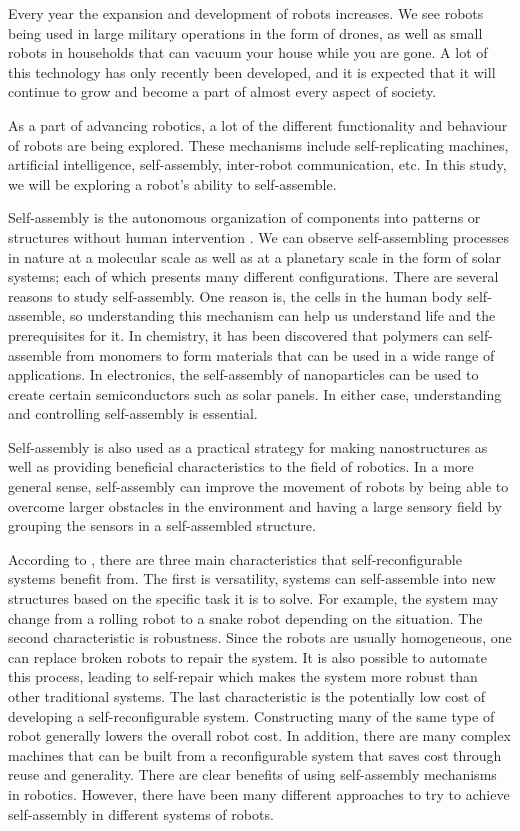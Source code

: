 Every year the expansion and development of robots increases. 
We see robots being used in large military operations in the form of drones, as well as small robots in households that can vacuum your house while you are gone.
A lot of this technology has only recently been developed, and it is expected that it will continue to grow and become a part of almost every aspect of society.

As a part of advancing robotics, a lot of the different functionality and behaviour of robots are being explored.
These mechanisms include self-replicating machines, artificial intelligence, self-assembly, inter-robot communication, etc.
In this study, we will be exploring a robot's ability to self-assemble. 

Self-assembly is the autonomous organization of components into patterns or structures without human intervention \cite{whitesides_self-assembly_2002}.
We can observe self-assembling processes in nature at a molecular scale \cite{heylighen_science_2001} as well as at a planetary scale in the form of solar systems; each of which presents many different configurations.
There are several reasons to study self-assembly.
One reason is, the cells in the human body self-assemble, so understanding this mechanism can help us understand life and the prerequisites for it.
In chemistry, it has been discovered that polymers can self-assemble from monomers to form materials that can be used in a wide range of applications\cite{chung_use_2004, siracusa_biodegradable_2008}. 
In electronics, the self-assembly of nanoparticles can be used to create certain semiconductors such as solar panels\cite{henini_chapter_2008}.
In either case, understanding and controlling self-assembly is essential.

Self-assembly is also used as a practical strategy for making nanostructures as well as providing beneficial characteristics to the field of robotics.
In a more general sense, self-assembly can improve the movement of robots by being able to overcome larger obstacles in the environment and having a large sensory field by grouping the sensors in a self-assembled structure.

According to \cite{yim_modular_2007}, there are three main characteristics that self-reconfigurable systems benefit from.
The first is versatility, systems can self-assemble into new structures based on the specific task it is to solve.
For example, the system may change from a rolling robot to a snake robot depending on the situation.
The second characteristic is robustness.
Since the robots are usually homogeneous, one can replace broken robots to repair the system.
It is also possible to automate this process, leading to self-repair which makes the system more robust than other traditional systems.
The last characteristic is the potentially low cost of developing a self-reconfigurable system.
Constructing many of the same type of robot generally lowers the overall robot cost.
In addition, there are many complex machines that can be built from a reconfigurable system that saves cost through reuse and generality.
There are clear benefits of using self-assembly mechanisms in robotics.
However, there have been many different approaches to try to achieve self-assembly in different systems of robots.

